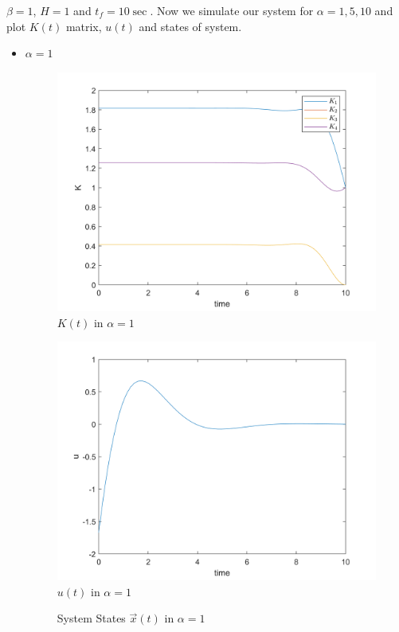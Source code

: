 $\beta = 1$, $H = 1$ and $t_f = 10\sec$.
Now we simulate our system for $\alpha = 1, 5, 10$ and plot $K(t)$ matrix, $u(t)$ and states of system.
\begin{itemize}
	\item $\alpha = 1$
		\begin{figure}[H]
		\caption{$K(t)$ in $\alpha = 1$}
		\centering
		\includegraphics[width=12cm]{../Code/Q3/figures/Kalpha1.png}
	\end{figure}
		\begin{figure}[H]
	\caption{$u(t)$ in $\alpha = 1$}
	\centering
	\includegraphics[width=12cm]{../Code/Q3/figures/ualpha1.png}
\end{figure}
		\begin{figure}[H]
	\caption{System States $\vec x(t)$ in $\alpha = 1$}

\end{figure}
\end{itemize}
